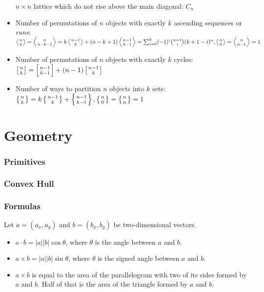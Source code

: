 \documentclass[8pt,a4paper]{amsart}
\begin{document}
\begin{itemize}
        $n\times n$ lattice which do not rise above the main diagonal: $C_n$
    \item Number of permutations of $n$ objects with exactly $k$ ascending
        sequences or {\it runs}: \\ $\left\langle {n \atop k} \right\rangle =
        \left\langle {n \atop n - k - 1} \right\rangle = k\left\langle {n - 1
        \atop k} \right\rangle + (n - k + 1)\left\langle {n-1 \atop k-1}
        \right\rangle = \sum_{i=0}^{k}(-1)^i \binom{n+1}{i} (k+1-i)^n,
        \left\langle {n \atop 0} \right\rangle = \left\langle {n \atop n -1}
        \right\rangle = 1$
    \item Number of permutations of $n$ objects with exactly $k$ cycles:
        $\left[n \atop k\right] = \left[n-1 \atop k-1\right] + (n-1)\left[n-1
        \atop k\right]$
    \item Number of ways to partition $n$ objects into $k$ sets: $\left\{n
        \atop k\right\} = k\left\{n-1 \atop k\right\} + \left\{n-1 \atop
        k-1\right\}, \left\{n\atop 0\right\} = \left\{n\atop n\right\} = 1$
\end{itemize}

\section{Geometry}
\subsubsection{Primitives}


\subsubsection{Convex Hull}


\subsubsection{Formulas}
Let $a = (a_x, a_y)$ and $b = (b_x, b_y)$ be two-dimensional vectors.
\begin{itemize}
    \item $a\cdot b = |a||b|\cos{\theta}$, where $\theta$ is the angle between
        $a$ and $b$.
    \item $a\times b = |a||b|\sin{\theta}$, where $\theta$ is the signed angle
        between $a$ and $b$.
    \item $a\times b$ is equal to the area of the parallelogram with two of its
        sides formed by $a$ and $b$. Half of that is the area of the triangle
        formed by $a$ and $b$.
\end{itemize}
\end{document}
